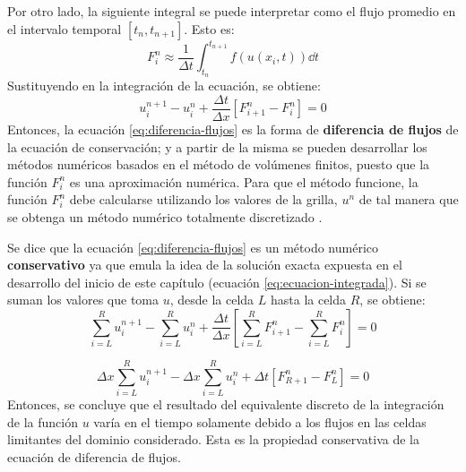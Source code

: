 \documentclass[12pt]{article}
\begin{document}
	Por otro lado, la siguiente integral se puede interpretar como el flujo promedio en el intervalo temporal $[t_n,t_{n+1}]$. Esto es:
	\begin{equation}
		F_{i}^{n} \approx \frac{1}{\Delta t} \int_{t_n}^{t_{n+1}} f(u(x_i,t)) \dd{t}
		\label{eq:flujo_promedio}
	\end{equation}
	Sustituyendo en la integración de la ecuación, se obtiene:
	\begin{equation}
		u_{i}^{n+1} - u_{i}^{n} + \frac{\Delta t}{\Delta x}\left[ F_{i+1}^n - F_{i}^{n}\right] = 0
		\label{eq:diferencia-flujos}
	\end{equation}
	Entonces, la ecuación \ref{eq:diferencia-flujos} es la forma de \textbf{diferencia de flujos} de la ecuación de conservación; y a partir de la misma se pueden desarrollar los métodos numéricos basados en el método de volúmenes finitos, puesto que la función $F_{i}^{n}$ es una aproximación numérica. Para que el método funcione, la función $F_{i}^{n}$ debe calcularse utilizando los valores de la grilla, $u^{n}$ de tal manera que se obtenga un método numérico totalmente discretizado \cite{LeVeque1998}. 
	
	Se dice que la ecuación \ref{eq:diferencia-flujos} es un método numérico \textbf{conservativo} ya que emula la idea de la solución exacta expuesta en el desarrollo del inicio de este capítulo (ecuación \ref{eq:ecuacion-integrada}). Si se suman los valores que toma $u$, desde la celda $L$ hasta la celda $R$, se obtiene:
	\begin{equation}
		\sum_{i=L}^{R} u_{i}^{n+1} - \sum_{i=L}^{R}  u_{i}^{n} + \frac{\Delta t}{\Delta x}\left[ \sum_{i=L}^{R}F_{i+1}^{n} - \sum_{i=L}^{R}F_{i}^{n}\right] =0
	\end{equation}
		
	\begin{equation}
		{\Delta x}\sum_{i=L}^{R} u_{i}^{n+1} - {\Delta x}\sum_{i=L}^{R}  u_{i}^{n} + {\Delta t}\left[ F_{R+1}^{n} - F_{L}^{n} \right] =0
	\end{equation}
	Entonces, se concluye que el resultado del equivalente discreto de la integración de la función $u$ varía en el tiempo solamente debido a los flujos en las celdas limitantes del dominio considerado. Esta es la propiedad conservativa de la ecuación de diferencia de flujos.
	
\end{document}
